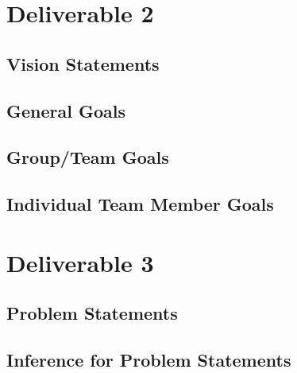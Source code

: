 \documentclass[12pt]{article}
\begin{document}
\setcounter{section}{2}
\setcounter{subsection}{0}
\section*{Deliverable 2}
\subsection{Vision Statements}
\subsection{General Goals}
\subsection{Group/Team Goals}
\subsection{Individual Team Member Goals}
\setcounter{section}{3}
\setcounter{subsection}{0}
\section*{Deliverable 3}
\subsection{Problem Statements}
\subsection{Inference for Problem Statements}
\end{document}

